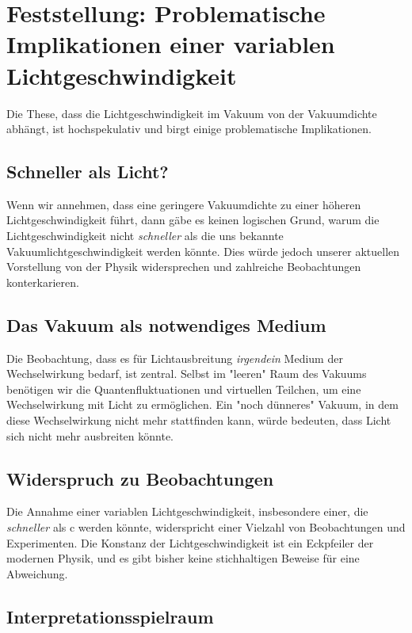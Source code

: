 \documentclass{article}
\begin{document}
	
	\section*{Feststellung: Problematische Implikationen einer variablen Lichtgeschwindigkeit}
	
	Die These, dass die Lichtgeschwindigkeit im Vakuum von der Vakuumdichte abhängt, ist hochspekulativ und birgt einige problematische Implikationen.
	
	\subsection*{Schneller als Licht?}
	
	Wenn wir annehmen, dass eine geringere Vakuumdichte zu einer höheren Lichtgeschwindigkeit führt, dann gäbe es keinen logischen Grund, warum die Lichtgeschwindigkeit nicht \textit{schneller} als die uns bekannte Vakuumlichtgeschwindigkeit werden könnte. Dies würde jedoch unserer aktuellen Vorstellung von der Physik widersprechen und zahlreiche Beobachtungen konterkarieren.
	
	\subsection*{Das Vakuum als notwendiges Medium}
	
	Die Beobachtung, dass es für Lichtausbreitung \textit{irgendein} Medium der Wechselwirkung bedarf, ist zentral. Selbst im "leeren" Raum des Vakuums benötigen wir die Quantenfluktuationen und virtuellen Teilchen, um eine Wechselwirkung mit Licht zu ermöglichen. Ein "noch dünneres" Vakuum, in dem diese Wechselwirkung nicht mehr stattfinden kann, würde bedeuten, dass Licht sich nicht mehr ausbreiten könnte.
	
	\subsection*{Widerspruch zu Beobachtungen}
	
	Die Annahme einer variablen Lichtgeschwindigkeit, insbesondere einer, die \textit{schneller} als c werden könnte, widerspricht einer Vielzahl von Beobachtungen und Experimenten. Die Konstanz der Lichtgeschwindigkeit ist ein Eckpfeiler der modernen Physik, und es gibt bisher keine stichhaltigen Beweise für eine Abweichung.
	
	\subsection*{Interpretationsspielraum}
	
\end{document}

